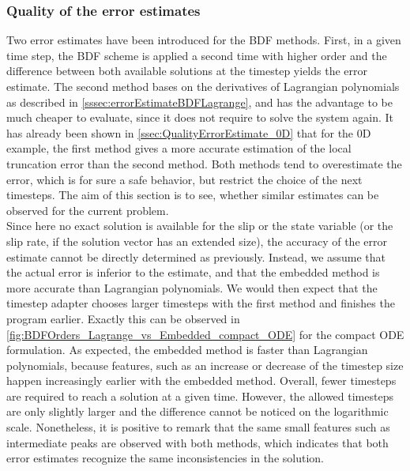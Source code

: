\subsubsection{Quality of the error estimates}
Two error estimates have been introduced for the BDF methods. First, in a given time step, the BDF scheme is applied a second time with higher order and the difference between both available solutions at the timestep yields the error estimate. The second method bases on the derivatives of Lagrangian polynomials as described in \autoref{sssec:errorEstimateBDFLagrange}, and has the advantage to be much cheaper to evaluate, since it does not require to solve the system again. It has already been shown in \autoref{ssec:QualityErrorEstimate_0D} that for the 0D example, the first method gives a more accurate estimation of the local truncation error than the second method. Both methods tend to overestimate the error, which is for sure a safe behavior, but restrict the choice of the next timesteps. The aim of this section is to see, whether similar estimates can be observed for the current problem. \\
Since here no exact solution is available for the slip or the state variable (or the slip rate, if the solution vector has an extended size), the accuracy of the error estimate cannot be directly determined as previously. Instead, we assume that the actual error is inferior to the estimate, and that the embedded method is more accurate than Lagrangian polynomials. We would then expect that the timestep adapter chooses larger timesteps with the first method and finishes the program earlier. Exactly this can be observed in \autoref{fig:BDFOrders_Lagrange_vs_Embedded_compact_ODE} for the compact ODE formulation. As expected, the embedded method is faster than Lagrangian polynomials, because features, such as an increase or decrease of the timestep size happen increasingly earlier with the embedded method. Overall, fewer timesteps are required to reach a solution at a given time. However, the allowed timesteps are only slightly larger and the difference cannot be noticed on the logarithmic scale. Nonetheless, it is positive to remark that the same small features such as intermediate peaks are observed with both methods, which indicates that both error estimates recognize the same inconsistencies in the solution. 
